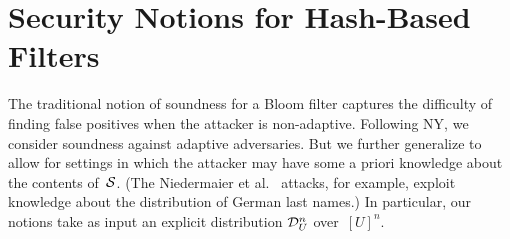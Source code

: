 \section{Security Notions for Hash-Based Filters}

%
%
%
The traditional notion of soundness for a Bloom filter captures the difficulty of finding false positives when the attacker is non-adaptive. Following NY, we consider soundness against adaptive adversaries. But we further generalize to allow for settings in which the attacker may have some a priori knowledge about the contents of~${\cal S}$. (The Niedermaier et al.~\cite{xxx} attacks, for example, exploit knowledge about the distribution of German last names.) In particular, our notions take as input an explicit distribution $\mathcal{D}_{U}^{n}$ over~$[U]^n$.

%

